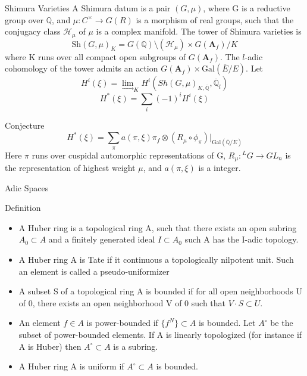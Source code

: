 \documentclass[aspectratio=1610]{ctexbeamer}
\def  \Gal      {\mathrm{Gal}}
\def  \rightlim {\underset{\longrightarrow}{\lim}}
\def  \bq       {\mathbb{Q}}
\begin{document}
\begin{frame}{Shimura Varieties}
	A Shimura datum  is a pair $(G, \mu)$, where  G is a reductive group over $\bq$, and $\mu: C^{\times} \to G(R)$ is a morphism of real groups, such that  the conjugacy class $\mathcal{H}_{\mu}$ of $\mu$ is a complex manifold. The tower of Shimura varieties is 
	$$
	\mathrm{Sh}(G, \mu)_K = G(\bq)  \setminus (\mathcal{H}_{\mu}) \times G(\mathbf{A}_f)/K
	$$
	where K runs over all compact open subgroups of $G(\mathbf{A}_f)$. The $l$-adic cohomology of the tower admits an action $G(\mathbf{A}_f) \times \Gal(\overline{E}/E)$.
	Let
	$$
	H^i(\xi) = \rightlim_KH^i(Sh(G, \mu)_{K, \overline{\bq}}, \overline{\bq}_l)
	$$
	$$
	H^*(\xi) = \sum_i (-1)^i H^i(\xi)
	$$
	\begin{alertblock}{Conjecture} 
		$$
		H^*(\xi)= \sum_{\pi} a(\pi, \xi) \pi_f  \otimes (R_{\mu} \circ \phi_{\pi})|_{\Gal(\overline{\bq}/E)}
		$$
		Here $\pi$ runs over cuspidal automorphic representations of G, $R_{\mu}: {}^L G \to GL_n$ is the representation of highest weight $\mu$, and $a(\pi, \xi)$ is a integer.
	\end{alertblock}

\end{frame}




\begin{frame}{Adic Spaces}
\begin{block}{Definition}
	\begin{itemize}

\item 	A Huber ring is a topological ring A, such that there exists an open subring
	$A_0 \subset A $ and a finitely generated ideal $I \subset A_0 $ such A has the I-adic topology. 

\item 	A Huber ring A is Tate if it continuous a topologically nilpotent unit. Such an element is called a pseudo-uniformizer

\item 	A subset S of a topological ring A is bounded if for all open neighborhoods U of 0, there exists an open neighborhood V of 0 such that $V\cdot S \subset U$. 

\item  An element $f \in A $ is power-bounded if $\{f^N\} \subset A $ is bounded. Let $A^{\circ} $ be the subset of power-bounded elements. If A is linearly topologized (for instance if A is Huber) then $A^{\circ} \subset A$ is a subring.
	
\item	A Huber ring A is uniform if $A^{\circ} \subset A $ is bounded.
	\end{itemize}
\end{block}

\end{frame}
\end{document}

